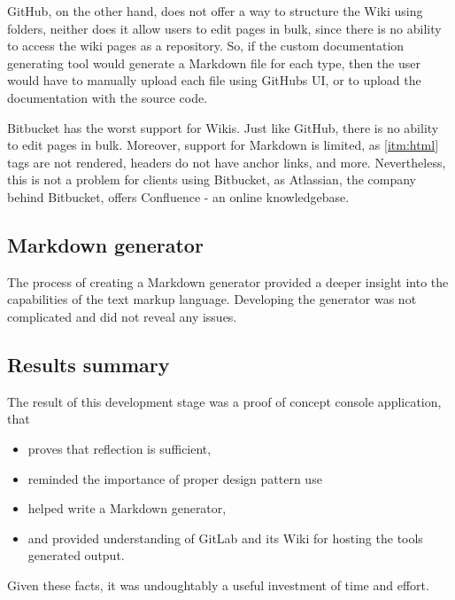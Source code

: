 GitHub, on the other hand, does not offer a way to structure the Wiki using folders, neither does it allow users to edit pages in bulk, since there is no ability to access the wiki pages as a repository. So, if the custom documentation generating tool would generate a Markdown file for each type, then the user would have to manually upload each file using GitHubs UI, or to upload the documentation with the source code.

Bitbucket has the worst support for Wikis.
Just like GitHub, there is no ability to edit pages in bulk.
Moreover, support for Markdown is limited, as \ref{itm:html} tags are not rendered, headers do not have anchor links, and more.
Nevertheless, this is not a problem for clients using Bitbucket, as Atlassian, the company behind Bitbucket, offers Confluence - an online knowledgebase.

\subsection{Markdown generator}

The process of creating a Markdown generator provided a deeper insight into the capabilities of the text markup language. Developing the generator was not complicated and did not reveal any issues.

\subsection{Results summary}

The result of this development stage was a proof of concept console application, that
\begin{itemize}
    \item proves that reflection is sufficient,
    \item reminded the importance of proper design pattern use
    \item helped write a Markdown generator,
    \item and provided understanding of GitLab and its Wiki for hosting the tools generated output.
\end{itemize}

Given these facts, it was undoughtably a useful investment of time and effort.